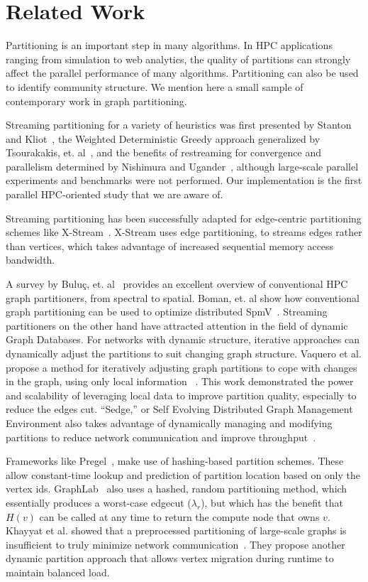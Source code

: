 \section{Related Work} \label{sec:rel}
Partitioning is an important step in many algorithms. In HPC applications ranging from simulation to web analytics, the quality of partitions can strongly affect the parallel performance of many algorithms. Partitioning can also be used to identify community structure. We mention here a small sample of contemporary work in graph partitioning.

Streaming partitioning for a variety of heuristics was first presented by Stanton and Kliot~\cite{Stanton:2012:SGP:2339530.2339722}, the Weighted Deterministic Greedy approach generalized by Tsourakakis, et. al~\cite{tsourakakis2012fennel}, and the benefits of restreaming for convergence and parallelism determined by Nishimura and Ugander~\cite{nishimura2013restream}, although large-scale parallel experiments and benchmarks were not performed. Our implementation is the first parallel HPC-oriented study that we are aware of. 

Streaming partitioning has been successfully adapted for edge-centric partitioning schemes like X-Stream~\cite{xstream}.
X-Stream uses edge partitioning, to streams edges rather than vertices, which takes advantage of increased sequential memory access bandwidth.

A survey by Bulu\c{c}, et. al~\cite{gpsurvey} provides an excellent overview of conventional HPC graph partitioners, from spectral to spatial. Boman, et. al show how conventional graph partitioning can be used to optimize distributed SpmV~\cite{Bomansc13}. Streaming partitioners on the other hand have attracted attention in the field of dynamic Graph Databases. For networks with dynamic structure, iterative approaches can dynamically adjust the partitions to suit changing graph structure. Vaquero et al. propose a method for iteratively adjusting graph partitions to cope with changes in the graph, using only local information ~\cite{Vaquero:2013:APL:2523616.2525943}. This work demonstrated the power and scalability of leveraging local data to improve partition quality, especially to reduce the edges cut. ``Sedge,'' or Self Evolving Distributed Graph Management Environment also takes advantage of dynamically managing and modifying partitions to reduce network communication and improve throughput~\cite{Yangpart}.

Frameworks like Pregel~\cite{Malpregel}, make use of hashing-based partition schemes.
These allow constant-time lookup and prediction of partition location based on only the vertex ids.
GraphLab~\cite{Low:2012:DGF:2212351.2212354} also uses a hashed, random partitioning method, which essentially produces a worst-case edgecut ($\lambda_r$), but which has the benefit that $H(v)$ can be called at any time to return the compute node that owns $v$. Khayyat et al. showed that a preprocessed partitioning of large-scale graphs is insufficient to truly minimize network communication~\cite{khayyatmizan}. They propose another dynamic partition approach that allows vertex migration during runtime to maintain balanced load.

